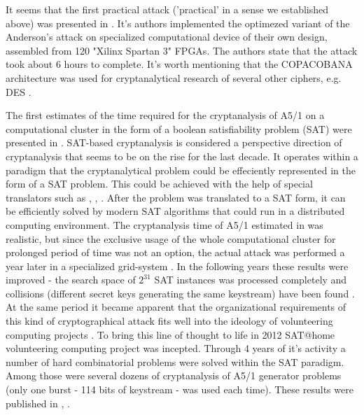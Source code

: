 \documentclass[runningheads,a4paper]{llncs}[2015/06/24]
\newcommand{\commentatside}[1]{\pdfcomment[color={0.045 0.278 0.643},icon=Note]{#1}}
\newcommand{\todo}[1]{\commentatside{#1}}
\begin{document}
It seems that the first practical attack ('practical' in a sense we established
above) was presented in \cite{COPAC_1}. It's authors implemented the optimezed
variant of the Anderson's attack on specialized computational device of their
own design, assembled from 120 "Xilinx Spartan 3" FPGAs. The authors state
\cite{COPAC_1} that the attack took about 6 hours to complete. It's worth
mentioning that the COPACOBANA architecture was used for cryptanalytical
research of several other ciphers, e.g. DES \cite{COPAC_2}.

The first estimates of the time required for the cryptanalysis of A5/1 on a
computational cluster in the form of a boolean satisfiability problem (SAT)
\cite{HANDBOOK} were presented in \cite{PACO-2008}. SAT-based cryptanalysis is
considered a perspective direction of cryptanalysis that seems to be on the
rise for the last decade. It operates within a paradigm that the
cryptanalytical problem could be effeciently represented in the form of a SAT
problem. This could be achieved with the help of special translators such as
\cite{CRYPTOL}, \cite{URSA}, \cite{TRANSALG}. After the problem was translated
to a SAT form, it can be efficiently solved by modern SAT algorithms that could
run in a distributed computing environment. The cryptanalysis time of A5/1
estimated in \cite{PACO-2008} was realistic, but since the exclusive usage of
the whole computational cluster for prolonged period of time was not an option,
the actual attack was performed a year later in a specialized grid-system
\cite{TRUDY_ISA}. In the following years these results were improved - the
search space of $2^{31}$ SAT instances was processed completely and collisions
(different secret keys generating the same keystream) have been found
\cite{SZBP}. At the same period it became apparent that the organizational
requirements of this kind of cryptographical attack fits well into the ideology
of volunteering computing projects \todo{cite what?}. To bring this line of
thought to life in 2012 SAT@home \cite{SATHOME} volunteering computing project
was incepted. Through 4 years of it's activity a number of hard combinatorial
problems were solved within the SAT paradigm. Among those were several dozens
of cryptanalysis of A5/1 generator problems (only one burst - 114 bits of
keystream - was used each time). These results were published in
\cite{PACT_2015}, \cite{SPRINGER}.
\end{document}
